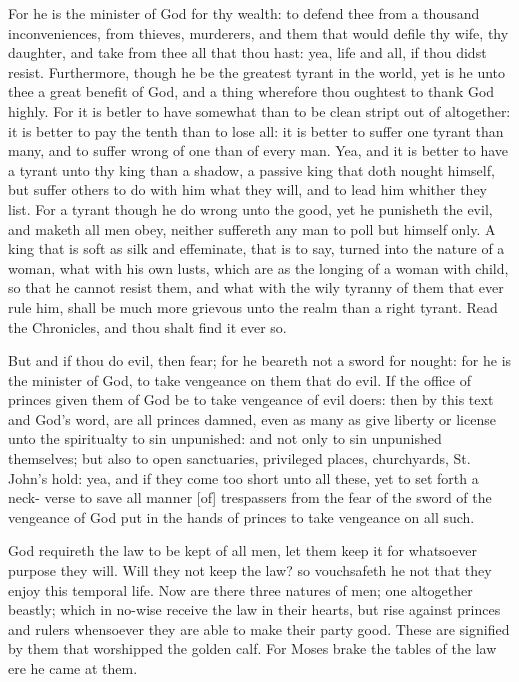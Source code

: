 For he is the minister of God for thy wealth: to defend 
thee from a thousand inconveniences, from thieves, murderers,
and them that would defile thy wife, thy daughter, 
and take from thee all that thou hast: yea, life and all, 
if thou didst resist. Furthermore, though he be the 
greatest tyrant in the world, yet is he unto thee a great 
benefit of God, and a thing wherefore thou oughtest to 
thank God highly. For it is betler to have somewhat 
than to be clean stript out of altogether: it is better 
to pay the tenth than to lose all: it is better to 
suffer one tyrant than many, and to suffer wrong of one 
than of every man. Yea, and it is better to have a tyrant 
unto thy king than a shadow, a passive king that doth 
nought himself, but suffer others to do with him what they 
will, and to lead him whither they list. For a tyrant 
though he do wrong unto the good, yet he punisheth the 
evil, and maketh all men obey, neither suffereth any man 
to poll but himself only. A king that is soft as silk and 
effeminate, that is to say, turned into the nature of a 
woman, what with his own lusts, which are as the longing 
of a woman with child, so that he cannot resist them, and 
what with the wily tyranny of them that ever rule him, shall 
be much more grievous unto the realm than a right tyrant. 
Read the Chronicles, and thou shalt find it ever so.

But and if thou do evil, then fear; for he beareth not 
a sword for nought: for he is the minister of God, to 
take vengeance on them that do evil. If the office of 
princes given them of God be to take vengeance of evil 
doers: then by this text and God's word, are all princes 
damned, even as many as give liberty or license unto the 
spiritualty to sin unpunished: and not only to sin unpunished
themselves; but also to open sanctuaries, privileged
places, churchyards, St. John's hold: yea, and if 
they come too short unto all these, yet to set forth a neck- 
verse to save all manner [of] trespassers from the fear of the 
sword of the vengeance of God put in the hands of princes 
to take vengeance on all such. 

God requireth the law to be kept of all men, let them
keep it for whatsoever purpose they will. Will they not 
keep the law? so vouchsafeth he not that they enjoy this
temporal life. Now are there three natures of men; one 
altogether beastly; which in no-wise receive the law in 
their hearts, but rise against princes and rulers whensoever 
they are able to make their party good. These are signified
by them that worshipped the golden calf. For 
Moses brake the tables of the law ere he came at 
them.

